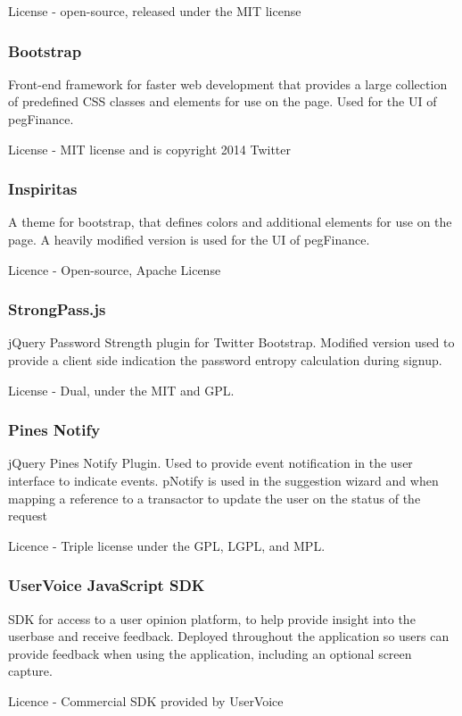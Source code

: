 \begin{appendices}
License - open-source, released under the MIT license

\subsubsection{Bootstrap}
Front-end framework for faster web development that provides a large collection of predefined CSS classes and elements for use on the page.
%
Used for the UI of pegFinance.

License - MIT license and is copyright 2014 Twitter

\subsubsection{Inspiritas}
A theme for bootstrap, that defines colors and additional elements for use on the page.
%
A heavily modified version is used for the UI of pegFinance.

Licence - Open-source, Apache License

\subsubsection{StrongPass.js}
jQuery Password Strength plugin for Twitter Bootstrap.
%
Modified version used to provide a client side indication the password entropy calculation during signup.

License - Dual, under the MIT and GPL.

\subsubsection{Pines Notify}
jQuery Pines Notify Plugin. Used to provide event notification in the user interface to indicate events.
%
pNotify is used in the suggestion wizard and when mapping a reference to a transactor to update the user on the status of the request

Licence - Triple license under the GPL, LGPL, and MPL.

\subsubsection{UserVoice JavaScript SDK}
SDK for access to a user opinion platform, to help provide insight into the userbase and receive feedback.
%
Deployed throughout the application so users can provide feedback when using the application, including an optional screen capture.

Licence - Commercial SDK provided by UserVoice


\end{appendices}
